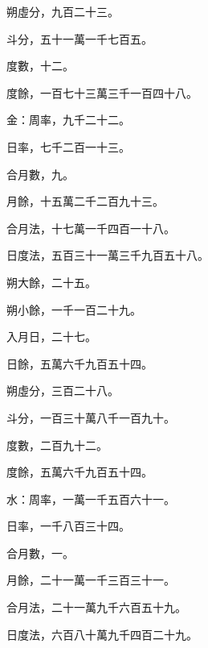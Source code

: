 \begin{pinyinscope}
 朔虛分，九百二十三。



 斗分，五十一萬一千七百五。



 度數，十二。



 度餘，一百七十三萬三千一百四十八。



 金：周率，九千二十二。



 日率，七千二百一十三。



 合月數，九。



 月餘，十五萬二千二百九十三。



 合月法，十七萬一千四百一十八。



 日度法，五百三十一萬三千九百五十八。



 朔大餘，二十五。



 朔小餘，一千一百二十九。



 入月日，二十七。



 日餘，五萬六千九百五十四。



 朔虛分，三百二十八。



 斗分，一百三十萬八千一百九十。



 度數，二百九十二。



 度餘，五萬六千九百五十四。



 水：周率，一萬一千五百六十一。



 日率，一千八百三十四。



 合月數，一。



 月餘，二十一萬一千三百三十一。



 合月法，二十一萬九千六百五十九。



 日度法，六百八十萬九千四百二十九。




\end{pinyinscope}
